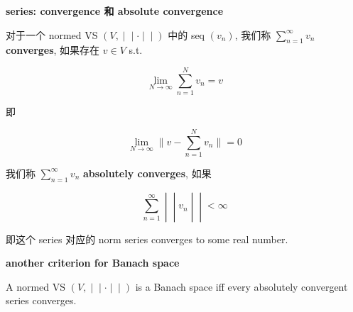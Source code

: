 \documentclass{qlnotes-export}
\begin{document}
\begin{definition}{\protect{}\label{kn-series-convergence-absolute-convergence}{\textbf{series:
convergence 和 absolute convergence}}}

对于一个 normed VS \(\left. (V, \middle| \middle| \cdot \middle| \middle| ) \right.\) 中的 seq \((v_{n})\), 我们称 \(\sum_{n = 1}^{\infty}v_{n}\) \textbf{converges}, 如果存在 \(v \in V\) s.t.

\[\lim\limits_{N\rightarrow\infty}\sum\limits_{n = 1}^{N}v_{n} = v\]

即

\[\lim\limits_{N\rightarrow\infty} \parallel v - \sum\limits_{n = 1}^{N}v_{n} \parallel = 0\]

我们称 \(\sum_{n = 1}^{\infty}v_{n}\) \textbf{absolutely converges}, 如果

\[\left. \sum\limits_{n = 1}^{\infty} \middle| \middle| v_{n} \middle| \middle| < \infty \right.\]

即这个 series 对应的 norm series converges to some real number.

\end{definition}

\begin{theorem}{\protect{}\label{kn-another-criterion-for-banach-space}{\textbf{another
criterion for Banach space}}}\label{thm-09-l-p-space-and-inequalities-another-criterion-for-banach-space}

A normed VS \(\left. (V, \middle| \middle| \cdot \middle| \middle| ) \right.\) is a Banach space iff every absolutely convergent series converges.

\end{theorem}
\end{document}
